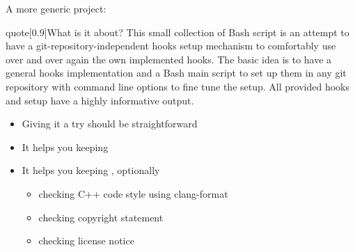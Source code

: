 \begin{frame}{A more generic project: }
    \begin{varblock}{quote}[0.9\textwidth]{What is it about?}
        This small collection of Bash script is an attempt to have a git-repository-independent hooks setup mechanism to comfortably use over and over again the own implemented hooks.
        The basic idea is to have a general hooks implementation and a Bash main script to set up them in any git repository with command line options to fine tune the setup.
        All provided hooks and setup have a highly informative output.
    \end{varblock}
    \vspace{2mm}
    \begin{itemize}
        \item Giving it a try should be straightforward
        \item It helps you keeping  
        \item It helps you keeping , optionally 
              \begin{itemize}
                  \item checking C++ code style using clang-format
                  \item checking copyright statement
                  \item checking license notice
              \end{itemize}
    \end{itemize}
\end{frame}

